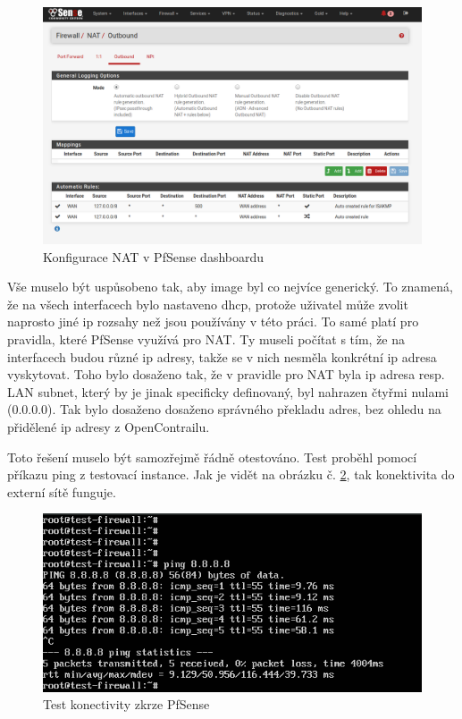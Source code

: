 \begin{figure}[h]
\begin{centering}
\includegraphics[scale=0.38]{images/nat}
\par\end{centering}
\caption{Konfigurace NAT v PfSense dashboardu\label{fig:nat}}
\end{figure}

Vše muselo být uspůsobeno tak, aby image byl co nejvíce generický. To znamená, že na všech interfacech bylo nastaveno dhcp, protože uživatel může zvolit naprosto jiné ip rozsahy než jsou používány v této práci. To samé platí pro pravidla, které PfSense využívá pro NAT. Ty museli počítat s tím, že na interfacech budou různé ip adresy, takže se v nich nesměla konkrétní ip adresa vyskytovat. Toho bylo dosaženo tak, že v pravidle pro NAT byla ip adresa resp. LAN subnet, který by je jinak specificky definovaný, byl nahrazen čtyřmi nulami (0.0.0.0). Tak bylo dosaženo dosaženo správného překladu adres, bez ohledu na přidělené ip adresy z OpenContrailu.

Toto řešení muselo být samozřejmě řádně otestováno. Test proběhl pomocí příkazu ping z testovací instance. Jak je vidět na obrázku č. \ref{fig:test_pfsense}, tak konektivita do externí sítě funguje.

\begin{figure}[h]
\begin{centering}
\includegraphics[scale=0.5]{images/test_pfsense}
\par\end{centering}
\caption{Test konectivity zkrze PfSense\label{fig:test_pfsense}}
\end{figure}

